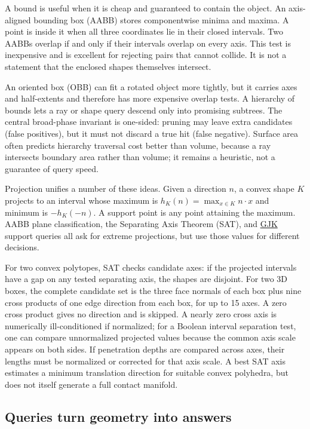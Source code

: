 A bound is useful when it is cheap and guaranteed to contain the object. An axis-aligned bounding box (AABB) stores componentwise minima and maxima. A point is inside it when all three coordinates lie in their closed intervals. Two AABBs overlap if and only if their intervals overlap on every axis. This test is inexpensive and is excellent for rejecting pairs that cannot collide. It is not a statement that the enclosed shapes themselves intersect.

An oriented box (OBB) can fit a rotated object more tightly, but it carries axes and half-extents and therefore has more expensive overlap tests. A hierarchy of bounds lets a ray or shape query descend only into promising subtrees. The central broad-phase invariant is one-sided: pruning may leave extra candidates (false positives), but it must not discard a true hit (false negative). Surface area often predicts hierarchy traversal cost better than volume, because a ray intersects boundary area rather than volume; it remains a heuristic, not a guarantee of query speed.

Projection unifies a number of these ideas. Given a direction \(n\), a convex shape \(K\) projects to an interval whose maximum is \(h_K(n)=\max_{x\in K}n\cdot x\) and minimum is \(-h_K(-n)\). A support point is any point attaining the maximum. AABB plane classification, the Separating Axis Theorem (SAT), and \hyperref[appendix-aef6177f7b3f]{GJK} support queries all ask for extreme projections, but use those values for different decisions.

For two convex polytopes, SAT checks candidate axes: if the projected intervals have a gap on any tested separating axis, the shapes are disjoint. For two 3D boxes, the complete candidate set is the three face normals of each box plus nine cross products of one edge direction from each box, for up to 15 axes. A zero cross product gives no direction and is skipped. A nearly zero cross axis is numerically ill-conditioned if normalized; for a Boolean interval separation test, one can compare unnormalized projected values because the common axis scale appears on both sides. If penetration depths are compared across axes, their lengths must be normalized or corrected for that axis scale. A best SAT axis estimates a minimum translation direction for suitable convex polyhedra, but does not itself generate a full contact manifold.

\subsection{Queries turn geometry into answers}\label{03-visual-computing-i-ch020-queries-turn-geometry-into-answers}

